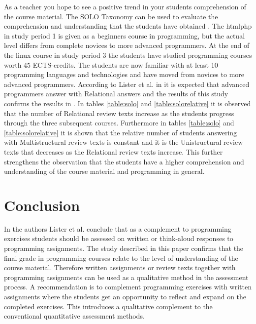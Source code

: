 \documentclass[twoside,twocolumn,a4paper,11pt,english]{article}
\begin{document}
As a teacher you hope to see a positive trend in your students comprehension of the course material. The SOLO Taxonomy can be used to evaluate the comprehension and understanding that the students have obtained \cite{biggs1982evaluation}. The htmlphp in study period 1 is given as a beginners course in programming, but the actual level differs from complete novices to more advanced programmers. At the end of the linux course in study period 3 the students have studied programming courses worth 45 ECTS-credits. The students are now familiar with at least 10 programming languages and technologies and have moved from novices to more advanced programmers. According to Lister et al. in \cite{lister2006not} it is expected that advanced programmers answer with Relational answers and the results of this study confirms the results in \cite{lister2006not}. In tables \ref{table:solo} and \ref{table:solorelative} it is observed that the number of Relational review texts increase as the students progress through the three subsequent courses. Furthermore in tables \ref{table:solo} and \ref{table:solorelative} it is shown that the relative number of students answering with Multistructural review texts is constant and it is the Unistructural review texts that decreases as the Relational review texts increase. This further strengthens the observation that the students have a higher comprehension and understanding of the course material and programming in general.




\section{Conclusion}

In \cite{lister2006not} the authors Lister et al. conclude that as a complement to programming exercises students should be assessed on written or think-aloud responses to programming assignments. The study described in this paper confirms that the final grade in programming courses relate to the level of understanding of the course material. Therefore written assignments or review texts together with programming assignments can be used as a qualitative method in the assessment process. A recommendation is to complement programming exercises with written assignments where the students get an opportunity to reflect and expand on the completed exercises. This introduces a qualitative complement to the conventional quantitative assessment methods.
\end{document}
